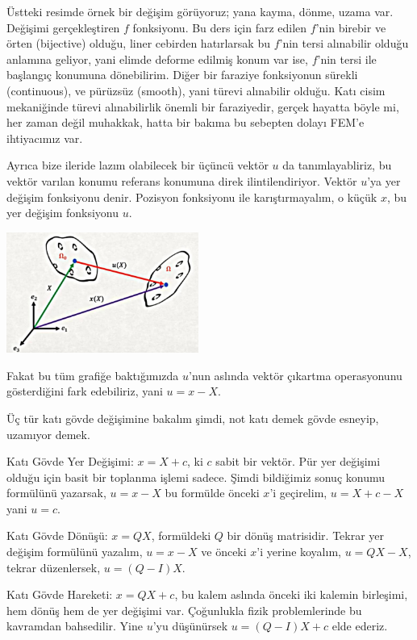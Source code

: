 \documentclass[12pt,fleqn]{article}\usepackage{../../common}
\begin{document}
Üstteki resimde örnek bir değişim görüyoruz; yana kayma, dönme, uzama
var. Değişimi gerçekleştiren $f$ fonksiyonu. Bu ders için farz edilen $f$'nin
birebir ve örten (bijective) olduğu, liner cebirden hatırlarsak bu $f$'nin tersi
alınabilir olduğu anlamına geliyor, yani elimde deforme edilmiş konum var ise,
$f$'nin tersi ile başlangıç konumuna dönebilirim. Diğer bir faraziye fonksiyonun
sürekli (continuous), ve pürüzsüz (smooth), yani türevi alınabilir olduğu. Katı
cisim mekaniğinde türevi alınabilirlik önemli bir faraziyedir, gerçek hayatta
böyle mi, her zaman değil muhakkak, hatta bir bakıma bu sebepten dolayı FEM'e
ihtiyacımız var.

Ayrıca bize ileride lazım olabilecek bir üçüncü vektör $u$ da tanımlayabliriz,
bu vektör varılan konumu referans konumuna direk ilintilendiriyor. Vektör $u$'ya
yer değişim fonksiyonu denir. Pozisyon fonksiyonu ile karıştırmayalım, o küçük
$x$, bu yer değişim fonksiyonu $u$.

\includegraphics[width=17em]{phy_020_strs_01_05.jpg}

Fakat bu tüm grafiğe baktığımızda $u$'nun aslında vektör çıkartma operasyonunu
gösterdiğini fark edebiliriz, yani $u = x - X$.

Üç tür katı gövde değişimine bakalım şimdi, not katı demek gövde esneyip,
uzamıyor demek.

Katı Gövde Yer Değişimi: $x = X + c$, ki $c$ sabit bir vektör. Pür yer değişimi
olduğu için basit bir toplanma işlemi sadece. Şimdi bildiğimiz sonuç konumu
formülünü yazarsak, $u = x - X$ bu formülde önceki $x$'i geçirelim, $u = X + c -
X$ yani $u = c$.

Katı Gövde Dönüşü: $x = Q X$, formüldeki $Q$ bir dönüş matrisidir. Tekrar yer
değişim formülünü yazalım, $u = x - X$ ve önceki $x$'i yerine koyalım, $u = QX -
X$, tekrar düzenlersek, $u = (Q-I)X$.

Katı Gövde Hareketi: $x = QX + c$, bu kalem aslında önceki iki kalemin
birleşimi, hem dönüş hem de yer değişimi var. Çoğunlukla fizik problemlerinde bu
kavramdan bahsedilir. Yine $u$'yu düşünürsek $u = (Q-I)X + c$ elde ederiz.
\end{document}
